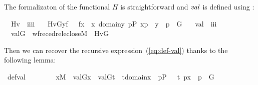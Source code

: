 \noindent The formalizaton of the functional $H$ is straightforward and $\operatorname{\mathit{val}}$ is defined using :
%
\begin{isabelle}
\isamarkupfalse%
\isanewline
\ \ Hv\ {\isacharcolon}{\isacharcolon}\ {\isachardoublequoteopen}i{\isasymRightarrow}i{\isasymRightarrow}i{\isasymRightarrow}i{\isachardoublequoteclose}\ \isanewline
\ \ {\isachardoublequoteopen}Hv{\isacharparenleft}G{\isacharcomma}y{\isacharcomma}f{\isacharparenright}\ {\isacharequal}{\isacharequal}\ {\isacharbraceleft}\ f{\isacharbackquote}x\ {\isachardot}{\isachardot}\ x{\isasymin}\ domain{\isacharparenleft}y{\isacharparenright}{\isacharcomma}\ {\isasymexists}p{\isasymin}P{\isachardot}\ {\isacharless}x{\isacharcomma}p{\isachargreater}\ {\isasymin}\ y\ {\isasymand}\ p\ {\isasymin}\ G\ {\isacharbraceright}{\isachardoublequoteclose}\isanewline
\isanewline
{}\isamarkupfalse%
\isanewline
\ \ val\ {\isacharcolon}{\isacharcolon}\ {\isachardoublequoteopen}i{\isasymRightarrow}i{\isasymRightarrow}i{\isachardoublequoteclose}\ \isanewline
\ \ {\isachardoublequoteopen}val{\isacharparenleft}G{\isacharcomma}{\isasymtau}{\isacharparenright}\ {\isacharequal}{\isacharequal}\ wfrec{\isacharparenleft}edrel{\isacharparenleft}eclose{\isacharparenleft}M{\isacharparenright}{\isacharparenright}{\isacharcomma}\ {\isasymtau}{\isacharcomma}\ Hv{\isacharparenleft}G{\isacharparenright}{\isacharparenright}{\isachardoublequoteclose}
\end{isabelle}
Then we can recover the recursive expression~(\ref{eq:def-val}) thanks to the
following lemma:
%
\begin{isabelle}
\isamarkupfalse%
\ def{\isacharunderscore}val{\isacharcolon}
\isanewline
\ \ \ \ \ \ \ \  {\isachardoublequoteopen}x{\isasymin}M\ {\isasymLongrightarrow}\ val{\isacharparenleft}G{\isacharcomma}x{\isacharparenright}\ {\isacharequal}\ {\isacharbraceleft}val{\isacharparenleft}G{\isacharcomma}t{\isacharparenright}\ {\isachardot}{\isachardot}\ t{\isasymin}domain{\isacharparenleft}x{\isacharparenright}\ {\isacharcomma}\ {\isasymexists}p{\isasymin}P\ {\isachardot}\ \ {\isasymlangle}t{\isacharcomma}\ p{\isasymrangle}{\isasymin}x\ {\isasymand}\ p\ {\isasymin}\ G\ {\isacharbraceright}{\isachardoublequoteclose}
\end{isabelle}

